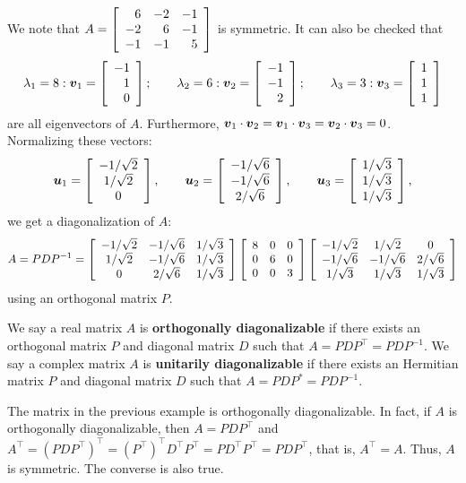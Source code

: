 \begin{Exam} We note that $A = \mtx{rrr}{6&-2&-1\\-2&6&-1\\-1&-1&5}$ is symmetric. It can also be checked that 
\[\lambda_1 = 8 : \bb v_1 = \vr{-1\\1\\0};\qquad \lambda_2 =6 : \bb v_2 = \vr{-1\\-1\\2};\qquad \lambda_3 = 3 : \bb v_3 = \vr{1\\1\\1} \] are all eigenvectors of $A$. Furthermore, $\bb v_1\cdot \bb v_2 = \bb v_1 \cdot \bb v_3 = \bb v_2 \cdot \bb v_3 = 0$. Normalizing these vectors:
\[\bb u_1  = \mtx{c}{-1/\sqrt{2}\\1/\sqrt{2}\\0},\qquad \bb u_2 = \mtx{c}{-1/\sqrt{6} \\ -1/\sqrt{6} \\ 2/\sqrt{6}},\qquad \bb u_3 = \mtx{c}{1/\sqrt{3}\\1/\sqrt{3}\\1/\sqrt{3}},\]  we get a diagonalization of $A$:
\[A = PDP^{-1} = \mtx{ccc}{ -1/\sqrt{2} & -1/\sqrt{6} & 1/\sqrt{3} \\ 1/\sqrt{2} & -1/\sqrt{6} & 1/\sqrt{3} \\ 0 & 2/\sqrt{6} & 1/\sqrt{3}}\mtx{ccc}{8&0&0\\0&6&0\\0&0&3}\mtx{ccc}{-1/\sqrt{2} & 1/\sqrt{2} & 0 \\ -1/\sqrt{6} & -1/\sqrt{6} & 2/\sqrt{6} \\ 1/\sqrt{3} & 1/\sqrt{3} & 1/\sqrt{3}}\] using an orthogonal matrix $P$.
\end{Exam}\vs

\begin{Def} We say a real matrix $A$ is \textbf{orthogonally diagonalizable} if there exists an orthogonal matrix $P$ and diagonal matrix $D$ such that $A = PDP^\top  = PDP^{-1}$. We say a complex matrix $A$ is \textbf{unitarily diagonalizable} if there exists an Hermitian matrix $P$ and diagonal matrix $D$ such that $A = PDP^* = PDP^{-1}$.
\end{Def}\vs

The matrix in the previous  example is orthogonally diagonalizable. In fact, if $A$ is orthogonally diagonalizable, then $A = PDP^\top $ and $A^\top  = (PDP^\top )^\top  = (P^\top )^\top D^\top P^\top  = PD^\top P^\top  = PDP^\top $, that is, $A^\top  = A$. Thus, $A$ is symmetric. The converse is also true.\\

